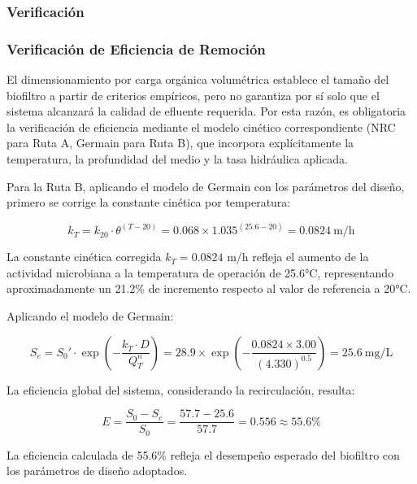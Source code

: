 \documentclass[12pt,a4paper]{article}
\begin{document}
\subsubsection{Verificación}

\subsubsection*{Verificación de Eficiencia de Remoción}

El dimensionamiento por carga orgánica volumétrica establece el tamaño del biofiltro a partir de criterios empíricos, pero no garantiza por sí solo que el sistema alcanzará la calidad de efluente requerida. Por esta razón, es obligatoria la verificación de eficiencia mediante el modelo cinético correspondiente (NRC para Ruta A, Germain para Ruta B), que incorpora explícitamente la temperatura, la profundidad del medio y la tasa hidráulica aplicada.

Para la Ruta B, aplicando el modelo de Germain con los parámetros del diseño, primero se corrige la constante cinética por temperatura:

\begin{equation}
k_T = k_{20} \cdot \theta^{(T-20)} = 0.068 \times 1.035^{(25.6-20)} = 0.0824\ \text{m/h}
\end{equation}

La constante cinética corregida $k_T = 0.0824$ m/h refleja el aumento de la actividad microbiana a la temperatura de operación de 25.6°C, representando aproximadamente un 21.2\% de incremento respecto al valor de referencia a 20°C.

Aplicando el modelo de Germain:

\begin{equation}
S_e = S_0' \cdot \exp\!\left(-\frac{k_T \cdot D}{Q_T^n}\right) = 28.9 \times \exp\!\left(-\frac{0.0824 \times 3.00}{(4.330)^{0.5}}\right) = 25.6\ \text{mg/L}
\end{equation}

La eficiencia global del sistema, considerando la recirculación, resulta:

\begin{equation}
E = \frac{S_0 - S_e}{S_0} = \frac{57.7 - 25.6}{57.7} = 0.556 \approx 55.6\%
\end{equation}

La eficiencia calculada de 55.6\% refleja el desempeño esperado del biofiltro con los parámetros de diseño adoptados.
\end{document}
